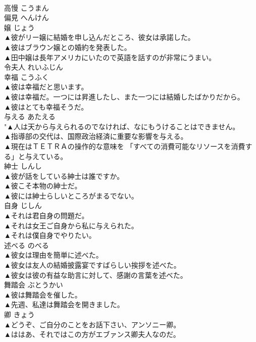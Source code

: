 \documentclass[8pt]{extreport}
\begin{document}
\begin{CJK}{UTF8}{min}
\\	高慢	こうまん	
\\	偏見	へんけん	
\\	嬢	じょう	
\\	▲彼がリー嬢に結婚を申し込んだところ、彼女は承諾した。 
\\	▲彼はブラウン嬢との婚約を発表した。 
\\	▲田中嬢は長年アメリカにいたので英語を話すのが非常にうまい。 
\\	令夫人	れいふじん	
\\	幸福	こうふく	
\\	▲彼は幸福だと思います。 
\\	▲彼は幸福だ。一つには昇進したし、また一つには結婚したばかりだから。 
\\	▲彼はとても幸福そうだ。 
\\	与える	あたえる	
\\	"▲人は天から与えられるのでなければ、なにもうけることはできません。 
\\	▲指導部の交代は、国際政治経済に重要な影響を与える。 
\\	▲現在はＴＥＴＲＡの操作的な意味を 「すべての消費可能なリソースを消費する」と与えている。 
\\	紳士	しんし	
\\	▲彼が話をしている紳士は誰ですか。 
\\	▲彼こそ本物の紳士だ。 
\\	▲彼には紳士らしいところがまるでない。 
\\	自身	じしん	
\\	▲それは君自身の問題だ。 
\\	▲それは女王ご自身から私に与えられた。 
\\	▲それは僕自身でやりたい。 
\\	述べる	のべる	
\\	▲彼女は理由を簡単に述べた。 
\\	▲彼女は友人の結婚披露宴ですばらしい挨拶を述べた。 
\\	▲彼女は彼の有益な助言に対して、感謝の言葉を述べた。 
\\	舞踏会	ぶとうかい	
\\	▲彼は舞踏会を催した。 
\\	▲先週、私達は舞踏会を開きました。 
\\	卿	きょう	
\\	▲どうぞ、ご自分のことをお話下さい、アンソニー卿。 
\\	▲ははあ、それではこの方がエブァンス卿夫人なのだ。 

\end{CJK}
\end{document}
